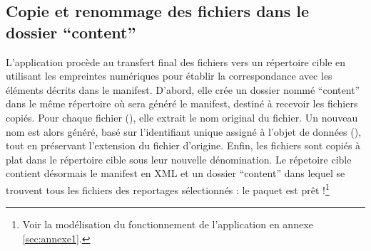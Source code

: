 \subsection*{Copie et renommage des fichiers dans le dossier \enquote{content}}

L'application procède au transfert final des fichiers vers un répertoire cible en utilisant les empreintes numériques pour établir la correspondance avec les éléments décrits dans le manifest. D'abord, elle crée un dossier nommé \enquote{content} dans le même répertoire où sera généré le manifest, destiné à recevoir les fichiers copiés. Pour chaque fichier (), elle extrait le nom original du fichier. Un nouveau nom est alors généré, basé sur l'identifiant unique assigné à l'objet de données (), tout en préservant l'extension du fichier d'origine. Enfin, les fichiers sont copiés à plat dans le répertoire cible sous leur nouvelle dénomination. Le répetoire cible contient désormais le manifest en XML et un dossier \enquote{content} dans lequel se trouvent tous les fichiers des reportages sélectionnés : le paquet est prêt !\footnote{Voir la modélisation du fonctionnement de l'application en annexe \ref{sec:annexe1}.}

